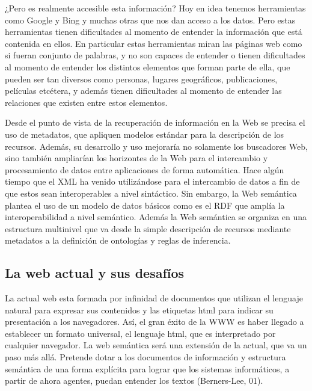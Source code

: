 
¿Pero es realmente accesible esta información? Hoy en idea tenemos herramientas como Google y Bing y muchas otras que nos dan acceso a los datos. Pero estas herramientas tienen dificultades al momento de entender la información que está contenida en ellos. En particular estas herramientas miran las páginas web como si fueran conjunto de palabras, y no son capaces de entender o tienen dificultades al momento de entender los distintos elementos que forman parte de ella, que pueden ser tan diversos como personas, lugares geográficos, publicaciones, películas etcétera, y además tienen dificultades al momento de entender las relaciones que existen entre estos elementos.

Desde el punto de vista de la recuperación de información en la Web se precisa el uso de metadatos, que apliquen modelos estándar para la descripción de los recursos. Además, su desarrollo y uso mejoraría no solamente los buscadores Web, sino también ampliarían los horizontes de la Web para el intercambio y procesamiento de datos entre aplicaciones de forma automática. Hace algún tiempo que el XML ha venido utilizándose para el intercambio de datos a fin de que estos sean interoperables a nivel sintáctico. Sin embargo, la Web semántica plantea el uso de un modelo de datos básicos como es el RDF que amplía la interoperabilidad a nivel semántico. Además la Web semántica se organiza en una estructura multinivel que va desde la simple descripción de recursos mediante metadatos a la definición de ontologías y reglas de inferencia.


\subsection{La web actual y sus desafíos}



La actual web esta formada por infinidad de documentos que utilizan el lenguaje natural para expresar sus contenidos y las etiquetas html para indicar su presentación a los navegadores. Así, el gran éxito de la WWW es haber llegado a establecer un formato universal, el lenguaje html, que es interpretado por cualquier navegador. La web semántica será una extensión de la actual, que va un paso más allá. Pretende dotar a los documentos de información y estructura semántica de una forma explícita para lograr que los sistemas informáticos, a partir de ahora agentes, puedan entender los textos (Berners-Lee, 01).

